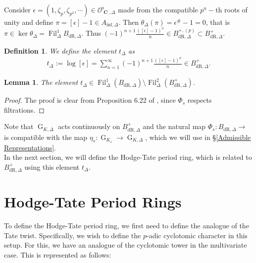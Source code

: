 \documentclass{amsart}
\newtheorem{lemma}[proposition]{Lemma}
\newtheorem{definition}[proposition]{Definition}
\newcommand{\mAinf}{A_{\mathrm{inf},\Delta}}
\DeclareMathOperator{\C}{\textbf{C}}
\DeclareMathOperator{\Bdr}{B_{dR}}
\newcommand{\mBdrp}{B^+_{\mathrm{dR},\Delta}}
\newcommand{\pmBdrp}{B^{+,(p)}_{\mathrm{dR},\Delta}}
\newcommand{\mBdr}{B_{\mathrm{dR},\Delta}}
\DeclareMathOperator{\G}{G}
\DeclareMathOperator{\Fil}{Fil}
\begin{document}
Consider $\epsilon=(1,\zeta_p,\zeta_{p^2},\cdots)\in\mathcal{O}^\flat_{\C,\Delta}$ made from the compatible $p^n-$th roots of unity and define $\pi=[\epsilon]-1\in\mAinf$. Then $\theta_\Delta(\pi)=\epsilon^\#-1=0$, that is $\pi\in\ker\theta_\Delta=\Fil^1_\Delta\mBdr$. Thus $(-1)^{n+1}\frac{([\epsilon]-1)^n}{n}\in\pmBdrp\subset\mBdrp$.

\begin{definition}
    We define the element $t_\Delta$ as
    \begin{align*}
        t_\Delta:=\log[\epsilon]=\sum\limits_{n=1}^\infty(-1)^{n+1}\frac{([\epsilon]-1)^n}{n}\in\mBdrp.
    \end{align*}
\end{definition}

\begin{lemma}
    The element $t_\Delta\in\Fil^1_\Delta(\mBdr)\setminus\Fil^2_\Delta(\mBdrp)$.
\end{lemma}

\begin{proof}
    The proof is clear from Proposition 6.22 of \cite{Fontaine}, since $\Phi_s$ respects filtrations.
\end{proof}

Note that $\G_{K,\Delta}$ acts continuously on $\mBdrp$ and the natural map $\Phi_s:\mBdr\to\Bdr$ is compatible with the map $\eta_s:\G_{K_s}\to\G_{K,\Delta}$, which we will use in \S\ref{Admissible Representations}.\\

In the next section, we will define the Hodge-Tate period ring, which is related to $\mBdrp$ using this element $t_\Delta$.


\section{Hodge-Tate Period Rings}

To define the Hodge-Tate period ring, we first need to define the analogue of the Tate twist. Specifically, we wish to define the $p$-adic cyclotomic character in this setup. For this, we have an analogue of the cyclotomic tower in the multivariate case. This is represented as follows: 
\end{document}
